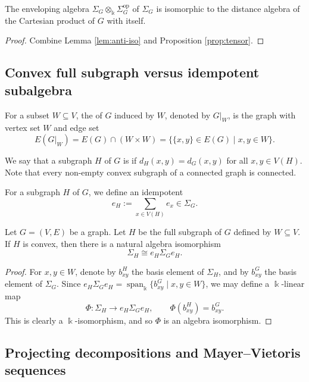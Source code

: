 \documentclass[a4paper,leqno]{amsart}
\begin{document}

\begin{prop}
The enveloping algebra $\Sigma_G\otimes_\Bbbk \Sigma_G^{\operatorname{op}}$ of $\Sigma_G$ is isomorphic to the distance algebra of the Cartesian product of $G$ with itself.
\end{prop}
\begin{proof}
    Combine Lemma \ref{lem:anti-iso} and Proposition \ref{prop:tensor}.
\end{proof}

\subsection{Convex full subgraph versus idempotent subalgebra}\label{subsec:full subgraph}

For a subset $W\subseteq V$, the  of $G$ induced by $W$, denoted by $G|_W$, is the graph with vertex set $W$ and edge set
$$E(G|_W)=E(G)\cap (W\times W)=\bigl\{\{x,y\}\in E(G)\mid x,y\in W\bigr\}.$$

We say that a subgraph $H$ of $G$ is   if $d_H(x,y)=d_G(x,y)$ for all $x,y\in V(H)$.  Note that every non-empty convex subgraph of a connected graph is connected.

For a subgraph $H$ of $G$, we define an idempotent
\[e_H:=\sum_{x\in V(H)}e_x\in \Sigma_G.
\]

\begin{lem}\label{lem:corner-convex-subgraph}
Let \(G=(V,E)\) be a graph.  Let $H$ be the full subgraph of $G$ defined by  \(W\subseteq V\).
If $H$ is convex, then there is a natural algebra isomorphism
\[\Sigma_H\cong e_H\Sigma_Ge_H.\]
\end{lem}

\begin{proof}
For \(x,y\in W\), denote by \(b^H_{xy}\) the basis element of \(\Sigma_H\), and by \(b^G_{xy}\) the basis element of \(\Sigma_G\). Since $e_H\Sigma_Ge_H=\operatorname{span}_{\Bbbk}\{b^G_{xy}\mid x,y\in W\}$, we may define a \(\Bbbk\)-linear map
\[\Phi:\Sigma_H\longrightarrow e_H\Sigma_Ge_H,\qquad\Phi(b^H_{xy})=b^G_{xy}.\]
This is clearly a $\Bbbk$-isomorphism, and so  \(\Phi\) is an algebra isomorphism.
\end{proof}

\subsection{Projecting decompositions and Mayer--Vietoris sequences}
\label{subsec:mayer-vietoris}
\end{document}
